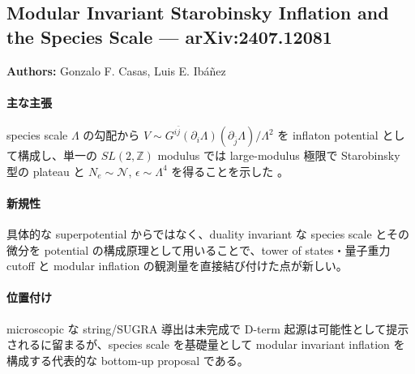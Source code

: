 \subsection{Modular Invariant Starobinsky Inflation and the Species Scale --- arXiv:2407.12081}

\textbf{Authors:} Gonzalo F. Casas, Luis E. Ibáñez

\paragraph{主な主張}
species scale $\Lambda$ の勾配から $V\sim G^{i\bar j}(\partial_i\Lambda)(\partial_{\bar j}\Lambda)/\Lambda^2$ を inflaton potential として構成し、単一の $SL(2,\mathbb{Z})$ modulus では large-modulus 極限で Starobinsky 型の plateau と $N_e\sim\mathcal N$, $\epsilon\sim\Lambda^4$ を得ることを示した \cite{Casas:2024species}。

\paragraph{新規性}
具体的な superpotential からではなく、duality invariant な species scale とその微分を potential の構成原理として用いることで、tower of states・量子重力 cutoff と modular inflation の観測量を直接結び付けた点が新しい。

\paragraph{位置付け}
microscopic な string/SUGRA 導出は未完成で D-term 起源は可能性として提示されるに留まるが、species scale を基礎量として modular invariant inflation を構成する代表的な bottom-up proposal である。

